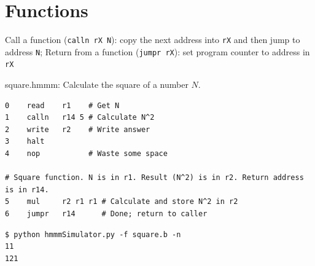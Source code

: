 \documentclass[8pt,a4paper,compress]{beamer}
\begin{document}
\section{Functions}

\begin{frame}[fragile]
\pause

Call a function (\lstinline{calln rX N}): copy the next address into \lstinline$rX$ and then jump to address \lstinline{N}; Return from a function (\lstinline{jumpr rX}): set program counter to address in \lstinline{rX}

\pause

\begin{framed}
\tiny square.hmmm: Calculate the square of a number $N$.
\end{framed}

\begin{lstlisting}[language={}]
0    read    r1    # Get N
1    calln   r14 5 # Calculate N^2 
2    write   r2    # Write answer
3    halt
4    nop           # Waste some space

# Square function. N is in r1. Result (N^2) is in r2. Return address is in r14.
5    mul     r2 r1 r1 # Calculate and store N^2 in r2
6    jumpr   r14      # Done; return to caller
\end{lstlisting}

\pause

\begin{lstlisting}[language={}]
$ python hmmmSimulator.py -f square.b -n
11
121
\end{lstlisting}
\end{frame}
\end{document}
